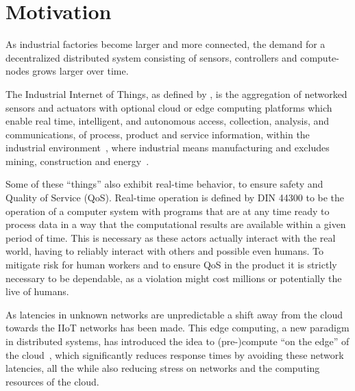 \section{Motivation}


As industrial factories become larger and more connected, the demand for a
decentralized distributed system consisting of sensors, controllers and
compute-nodes grows larger over time.

The Industrial Internet of Things, as defined by
\citeauthor{boyes_industrial_2018}, is the aggregation of networked sensors and
actuators with optional cloud or edge computing platforms which enable real
time, intelligent, and autonomous access, collection, analysis, and
communications, of process, product and service information, within the
industrial environment~\cite{boyes_industrial_2018}, where industrial means
manufacturing and excludes mining, construction and
energy~\cite{noauthor_industry_nodate}.

Some of these \enquote{things} also exhibit real-time behavior, to ensure safety
and Quality of Service (QoS). Real-time operation is defined by DIN 44300 to be
the operation of a computer system with programs that are at any time ready to
process data in a way that the computational results are available within a
given period of time. This is necessary as these actors actually interact with
the real world, having to reliably interact with others and possible even
humans. To mitigate risk for human workers and to ensure QoS in the product it
is strictly necessary to be dependable, as a violation might cost millions or
potentially the live of humans.


As latencies in unknown networks are unpredictable a shift away from the cloud
towards the IIoT networks has been made. This edge computing, a new paradigm in
distributed systems, has introduced the idea to (pre-)compute \enquote{on the
edge} of the cloud~\cite{shi_edge_2016}, which significantly reduces response
times by avoiding these network latencies, all the while also reducing stress on
networks and the computing resources of the cloud.

